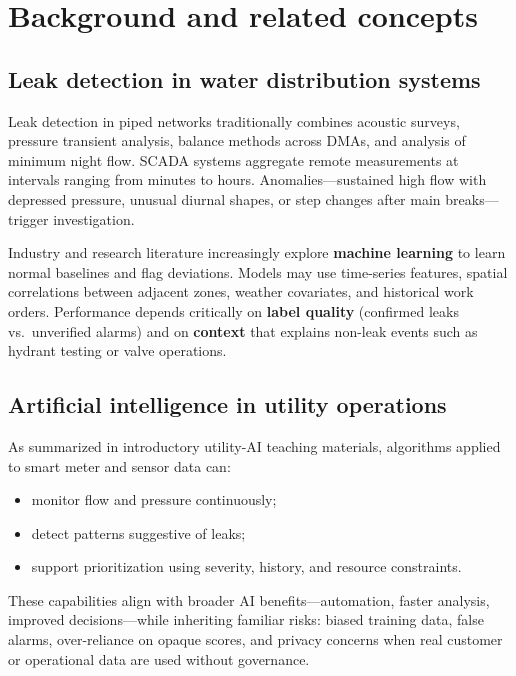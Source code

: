 \documentclass[12pt,a4paper]{article}
\begin{document}
\section{Background and related concepts}
\label{sec:background}

\subsection{Leak detection in water distribution systems}

Leak detection in piped networks traditionally combines acoustic surveys, pressure transient analysis, balance methods across DMAs, and analysis of minimum night flow. SCADA systems aggregate remote measurements at intervals ranging from minutes to hours. Anomalies---sustained high flow with depressed pressure, unusual diurnal shapes, or step changes after main breaks---trigger investigation.

Industry and research literature increasingly explore \textbf{machine learning} to learn normal baselines and flag deviations. Models may use time-series features, spatial correlations between adjacent zones, weather covariates, and historical work orders. Performance depends critically on \textbf{label quality} (confirmed leaks vs.\ unverified alarms) and on \textbf{context} that explains non-leak events such as hydrant testing or valve operations.

\subsection{Artificial intelligence in utility operations}

As summarized in introductory utility-AI teaching materials, algorithms applied to smart meter and sensor data can:
\begin{itemize}
    \item monitor flow and pressure continuously;
    \item detect patterns suggestive of leaks;
    \item support prioritization using severity, history, and resource constraints.
\end{itemize}

These capabilities align with broader AI benefits---automation, faster analysis, improved decisions---while inheriting familiar risks: biased training data, false alarms, over-reliance on opaque scores, and privacy concerns when real customer or operational data are used without governance.
\end{document}
